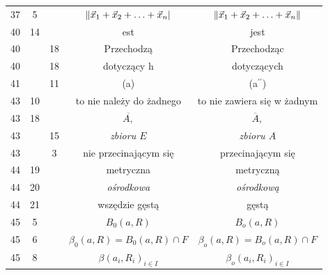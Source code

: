 \documentclass[a4paper,11pt]{article}
\begin{document}
\begin{center}
\begin{tabular}{|c|c|c|c|c|}
    37  &  5 & & $\Vert \vec{ x }_{ 1 } + \vec{ x }_{ 2 } + \ldots + \vec{ x }_{ n } |$
           & $\Vert \vec{ x }_{ 1 } + \vec{ x }_{ 2 } + \ldots + \vec{ x }_{ n } \Vert$ \\
    40  & 14 & & est & jest \\
    40  & & 18 & Przechodzą & Przechodząc \\
    40  & & 18 & dotyczący h & dotyczących \\
    41  & & 11 & (a) & (a$^{ \prime\prime }$) \\
    43  & 10 & & to nie należy do żadnego & to nie zawiera się w żadnym \\
    43  & 18 & & $\overline{A,}$ & $\overline{A},$ \\
    43  & & 15 & \textit{zbioru $E$} & \textit{zbioru $A$} \\
    43  & &  3 & nie przecinającym się & przecinającym się \\
    44  & 19 & & metryczna & metryczną \\
    44  & 20 & & \textit{ośrodkowa} & \textit{ośrodkową} \\
    44  & 21 & & wszędzie gęstą & gęstą \\
    45  &  5 & & $B_{ 0 }( a, R )$ & $B_{ o }( a, R )$ \\
    45  &  6 & & $\beta_{ 0 }( a, R ) = B_{ 0 }( a, R ) \cap F$
           & $\beta_{ o }( a, R ) = B_{ o }( a, R ) \cap F$ \\
    45  &  8 & & $\beta( a_{ i }, R_{ i } )_{ i \in I }$
           & $\beta_{ o }( a_{ i }, R_{ i } )_{ i \in I }$ \\
    \hline
  \end{tabular}

\end{center}
\end{document}
